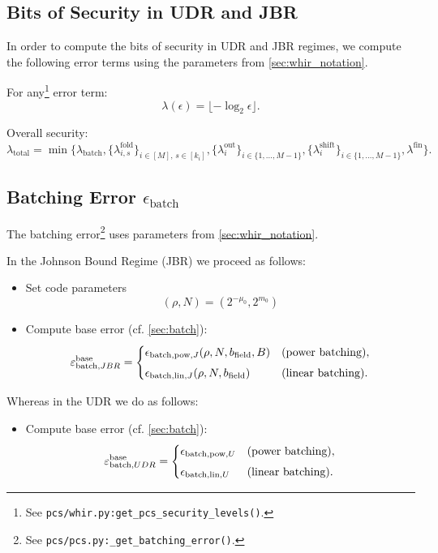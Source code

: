 \subsection{Bits of Security in UDR and JBR}

In order to compute the bits of security in UDR and JBR regimes, we compute the following error terms using the parameters from \cref{sec:whir_notation}.

For any\footnote{See \texttt{pcs/whir.py:get\_pcs\_security\_levels()}.} error term:
\[
  \lambda(\epsilon)
  = \lfloor-\log_2\epsilon\rfloor.
\]

Overall security:
\[
  \lambda_{\mathrm{total}}
    = \min\{
      \lambda_{\mathrm{batch}},
      \{\lambda^{\mathrm{fold}}_{i,s}\}_{i\in [M],\,s\in[k_i]},
      \{\lambda^{\mathrm{out}}_i\}_{i\in \{1,\ldots,M-1\}},
      \{\lambda^{\mathrm{shift}}_i\}_{i\in \{1,\ldots,M-1\}},
      \lambda^{\mathrm{fin}}
    \}.
\]

\subsection{Batching Error \(\epsilon_{\mathrm{batch}}\)}

The batching error\footnote{See \texttt{pcs/pcs.py:\_get\_batching\_error()}.} uses parameters from \cref{sec:whir_notation}.

In the Johnson Bound Regime (JBR) we proceed as follows:
\begin{itemize}
    \item Set code parameters $$
    (\rho,N)= \left(2^{-\mu_0}, 2^{m_0}\right)
    $$
    \item Compute base error (cf. \cref{sec:batch}):
\[
\varepsilon_{\mathrm{batch}, JBR}^{\text{base}} =
\begin{cases}
   \epsilon_{\mathrm{batch,pow},J} (\rho,N,b_{\mathrm{field}},B) & \text{(power batching)}, \\[4pt]
  \epsilon_{\mathrm{batch,lin},J} (\rho,N,b_{\mathrm{field}})& \text{(linear batching)}.
\end{cases}
\]
\end{itemize}
Whereas in the UDR we do as follows:
\begin{itemize}
    \item Compute base error (cf. \cref{sec:batch}):
\[
\varepsilon_{\mathrm{batch}, UDR}^{\text{base}} =
\begin{cases}
   \epsilon_{\mathrm{batch,pow},U}  & \text{(power batching)}, \\[4pt]
  \epsilon_{\mathrm{batch,lin},U} & \text{(linear batching)}.
\end{cases}
\]
\end{itemize}

